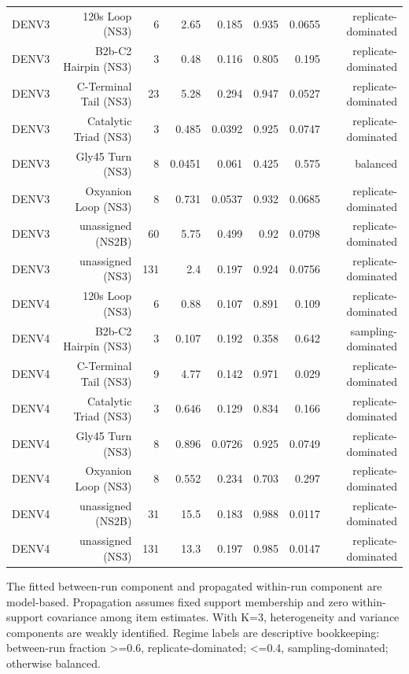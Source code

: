 \begin{table}[t]
\begin{tabular}{lrrrrrrr}
    DENV3 & 120s Loop (NS3) & 6 & 2.65 & 0.185 & 0.935 & 0.0655 & replicate-dominated \\
    DENV3 & B2b-C2 Hairpin (NS3) & 3 & 0.48 & 0.116 & 0.805 & 0.195 & replicate-dominated \\
    DENV3 & C-Terminal Tail (NS3) & 23 & 5.28 & 0.294 & 0.947 & 0.0527 & replicate-dominated \\
    DENV3 & Catalytic Triad (NS3) & 3 & 0.485 & 0.0392 & 0.925 & 0.0747 & replicate-dominated \\
    DENV3 & Gly45 Turn (NS3) & 8 & 0.0451 & 0.061 & 0.425 & 0.575 & balanced \\
    DENV3 & Oxyanion Loop (NS3) & 8 & 0.731 & 0.0537 & 0.932 & 0.0685 & replicate-dominated \\
    DENV3 & unassigned (NS2B) & 60 & 5.75 & 0.499 & 0.92 & 0.0798 & replicate-dominated \\
    DENV3 & unassigned (NS3) & 131 & 2.4 & 0.197 & 0.924 & 0.0756 & replicate-dominated \\
    DENV4 & 120s Loop (NS3) & 6 & 0.88 & 0.107 & 0.891 & 0.109 & replicate-dominated \\
    DENV4 & B2b-C2 Hairpin (NS3) & 3 & 0.107 & 0.192 & 0.358 & 0.642 & sampling-dominated \\
    DENV4 & C-Terminal Tail (NS3) & 9 & 4.77 & 0.142 & 0.971 & 0.029 & replicate-dominated \\
    DENV4 & Catalytic Triad (NS3) & 3 & 0.646 & 0.129 & 0.834 & 0.166 & replicate-dominated \\
    DENV4 & Gly45 Turn (NS3) & 8 & 0.896 & 0.0726 & 0.925 & 0.0749 & replicate-dominated \\
    DENV4 & Oxyanion Loop (NS3) & 8 & 0.552 & 0.234 & 0.703 & 0.297 & replicate-dominated \\
    DENV4 & unassigned (NS2B) & 31 & 15.5 & 0.183 & 0.988 & 0.0117 & replicate-dominated \\
    DENV4 & unassigned (NS3) & 131 & 13.3 & 0.197 & 0.985 & 0.0147 & replicate-dominated \\
    \bottomrule
  \end{tabular}
  \par\smallskip
  \begin{minipage}{0.98\linewidth}\footnotesize
  The fitted between-run component and propagated within-run component are model-based. Propagation assumes fixed support membership and zero within-support covariance among item estimates. With K=3, heterogeneity and variance components are weakly identified. Regime labels are descriptive bookkeeping: between-run fraction >=0.6, replicate-dominated; <=0.4, sampling-dominated; otherwise balanced.
  \end{minipage}
\end{table}

